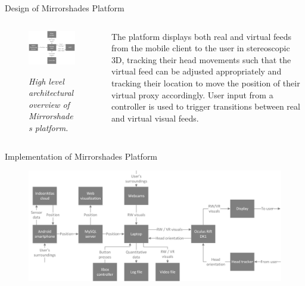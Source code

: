 \documentclass[final,t]{beamer}
\begin{document}
\begin{frame}
\begin{columns}[t]
\begin{column}{.31\linewidth}
		\begin{block}{Design of Mirrorshades Platform}
			\begin{columns}
				\begin{column}{.45\linewidth}
					\begin{figure}[h]
				\begin{center}
					\includegraphics[width=\linewidth]{images/system-architecture.png}
					
					\textit{High level architectural overview of Mirrorshades platform.}
				\end{center}
			\end{figure}
				\end{column}
				
				\begin{column}{.45\linewidth}
					The platform displays both real and virtual feeds from the mobile client to the user in stereoscopic 3D, tracking their head movements such that the virtual feed can be adjusted appropriately and  tracking their location to move the position of their virtual proxy accordingly. User input from a controller is used to trigger transitions between real and virtual visual feeds.				
				\end{column}		
			\end{columns}
		\end{block}

		\begin{block}{Implementation of Mirrorshades Platform}
			\begin{figure}[h]
				\begin{center}
					\includegraphics[width=\linewidth]{images/experimental-implementation.png}


\end{center}
\end{figure}
\end{block}
\end{column}
\end{columns}
\end{frame}
\end{document}
